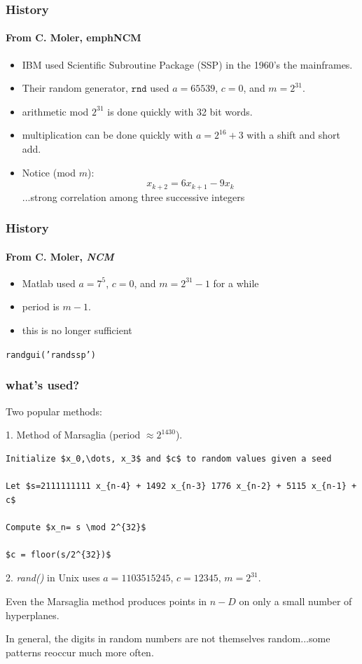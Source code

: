 \documentclass[10pt]{beamer}
\begin{document}
\begin{frame}
\frametitle{History} 
\framesubtitle{From C. Moler, emph{NCM}}
\begin{itemize}
    \item IBM used Scientific Subroutine Package (SSP) in the 1960's the
mainframes.
    \item Their random generator, $\texttt{rnd}$ used $a=65539$, $c=0$, and
$m=2^{31}$.
    \item arithmetic mod $2^{31}$ is done quickly with 32 bit words.
    \item multiplication can be done quickly with $a=2^{16}+3$ with a shift and
short add.
    \item Notice (mod $m$):
\[
    x_{k+2} = 6x_{k+1} - 9 x_{k}
\]
...strong correlation among three successive integers
\end{itemize}
\end{frame}
\begin{frame}
\frametitle{History} 
\framesubtitle{From C. Moler, \emph{NCM}}
\begin{itemize}
    \item Matlab used $a = 7^5$, $c=0$, and $m=2^{31}-1$ for a while
    \item period is $m-1$.
    \item this is no longer sufficient
\end{itemize}
\bigskip

\texttt{randgui('randssp')}
\end{frame}
\begin{frame}[fragile]
\frametitle{what's used?}
Two popular methods:

1. Method of Marsaglia (period $\approx 2^{1430}$).
\begin{lstlisting}[mathescape]
Initialize $x_0,\dots, x_3$ and $c$ to random values given a seed

Let $s=2111111111 x_{n-4} + 1492 x_{n-3} 1776 x_{n-2} + 5115 x_{n-1} + c$

Compute $x_n= s \mod 2^{32}$

$c = floor(s/2^{32})$
\end{lstlisting}
\bigskip

2. \emph{rand()} in Unix uses $a=1103515245$, $c=12345$, $m=2^{31}$.
\bigskip

\begin{alertblock}{}
    Even the Marsaglia method produces points in $n-D$ on only a small number of
hyperplanes.
\end{alertblock}
\begin{alertblock}{}
    In general, the digits in random numbers are not themselves random...some
patterns reoccur much more often.
\end{alertblock}
\end{frame}
\end{document}
